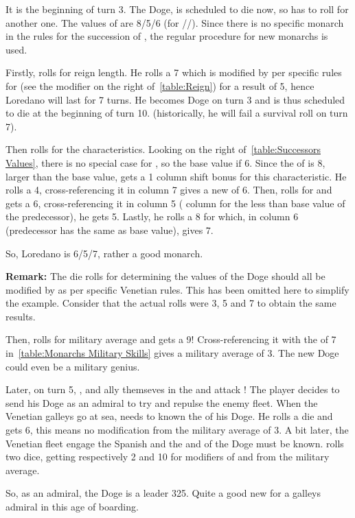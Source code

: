 \begin{exemple}
  It is the beginning of turn 3. The Doge, \monarqueBarbarigo is
  scheduled to die now, so \VEN has to roll for another one. The values
  of \monarqueBarbarigo are 8/5/6 (for \ADM/\DIP/\MIL). Since there is
  no specific monarch in the rules for the succession of
  \monarqueBarbarigo, the regular procedure for new monarchs is used.

  Firstly, \VEN rolls for reign length. He rolls a 7 which is modified
  by  per specific rules for \VEN (see the modifier on the
  right of~\ref{table:Reign}) for a result of 5, hence Loredano will
  last for 7 turns. He becomes Doge on turn 3 and is thus scheduled to
  die at the beginning of turn 10. (historically, he will fail a
  survival roll on turn 7).

  Then \VEN rolls for the characteristics. Looking on the right
  of~\ref{table:Successors Values}, there is no special case for \VEN,
  so the base value if 6. Since the \ADM of \monarqueBarbarigo is 8,
  larger than the base value, \VEN gets a 1 column shift bonus for this
  characteristic. He rolls a 4, cross-referencing it in column 7 gives a
  new \ADM of 6. Then, \VEN rolls for \DIP and gets a 6,
  cross-referencing it in column 5 ( column for the less than
  base value of the predecessor), he gets 5. Lastly, he rolls a 8 for
  \MIL which, in column 6 (predecessor has the same as base value),
  gives 7.

  So, Loredano is 6/5/7, rather a good monarch.

  \textbf{Remark:} The die rolls for determining the values of the Doge
  should all be modified by  as per specific Venetian
  rules. This has been omitted here to simplify the example. Consider
  that the actual rolls were 3, 5 and 7 to obtain the same results.

  Then, \VEN rolls for military average and gets a 9! Cross-referencing
  it with the \MIL of 7 in~\ref{table:Monarchs Military Skills} gives a
  military average of 3. The new Doge could even be a military genius.

  Later, on turn 5, \HIS, \FRA and \paysPapaute ally themseves in the
   and attack \VEN! The player decides to send
  his Doge as an admiral to try and repulse the enemy fleet. When the
  Venetian galleys go at sea, \VEN needs to known the 
  of his Doge. He rolls a die and gets 6, this means no modification
  from the military average of 3. A bit later, the Venetian fleet engage
  the Spanish and the  and  of the Doge must be
  known. \VEN rolls two dice, getting respectively 2 and 10 for
  modifiers of  and  from the military average.

  So, as an admiral, the Doge is a leader 325. Quite a good new for a
  galleys admiral in this age of boarding.
\end{exemple}

